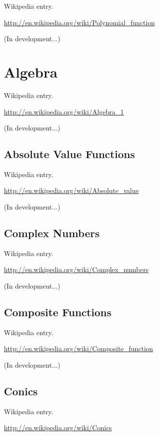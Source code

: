 \documentclass[12pt,oneside]{book}
\begin{document}
Wikipedia entry.

\href{http://en.wikipedia.org/wiki/Polynomial_function}{http://en.wikipedia.org/wiki/Polynomial\_function}

(In development...)

\section[Algebra]{Algebra}

Wikipedia entry.

\href{http://en.wikipedia.org/wiki/Algebra_1}{http://en.wikipedia.org/wiki/Algebra\_1}

(In development...)

\subsection[Absolute Value Functions]{Absolute Value Functions}

Wikipedia entry.

\href{http://en.wikipedia.org/wiki/Absolute_value}{http://en.wikipedia.org/wiki/Absolute\_value}

(In development...)

\subsection[Complex Numbers]{Complex Numbers}

Wikipedia entry.

\href{http://en.wikipedia.org/wiki/Complex_numbers}{http://en.wikipedia.org/wiki/Complex\_numbers}

(In development...)

\subsection[Composite Functions]{Composite Functions}

Wikipedia entry.

\href{http://en.wikipedia.org/wiki/Composite_function}{http://en.wikipedia.org/wiki/Composite\_function}

(In development...)

\subsection[Conics]{Conics}

Wikipedia entry.

\href{http://en.wikipedia.org/wiki/Conics}{http://en.wikipedia.org/wiki/Conics}
\end{document}
